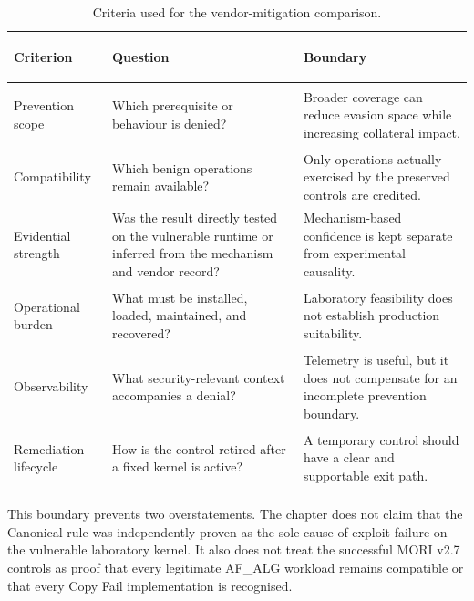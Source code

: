 \begin{table}[H]
    \centering
    \caption{Criteria used for the vendor-mitigation comparison.}
    \label{tab:vendor-comparison-criteria}
    \small
    \begin{tabularx}{\textwidth}{@{}>{\bfseries\raggedright\arraybackslash}p{}>{\raggedright\arraybackslash}p{}Y@{}}
        \toprule
        Criterion & Question & Boundary \\
        \midrule
        Prevention scope &
        Which prerequisite or behaviour is denied? &
        Broader coverage can reduce evasion space while increasing collateral
        impact. \\

        Compatibility &
        Which benign operations remain available? &
        Only operations actually exercised by the preserved controls are
        credited. \\

        Evidential strength &
        Was the result directly tested on the vulnerable runtime or inferred
        from the mechanism and vendor record? &
        Mechanism-based confidence is kept separate from experimental causality. \\

        Operational burden &
        What must be installed, loaded, maintained, and recovered? &
        Laboratory feasibility does not establish production suitability. \\

        Observability &
        What security-relevant context accompanies a denial? &
        Telemetry is useful, but it does not compensate for an incomplete
        prevention boundary. \\

        Remediation lifecycle &
        How is the control retired after a fixed kernel is active? &
        A temporary control should have a clear and supportable exit path. \\
        \bottomrule
    \end{tabularx}
\end{table}

This boundary prevents two overstatements. The chapter does not claim that the
Canonical rule was independently proven as the sole cause of exploit failure
on the vulnerable laboratory kernel. It also does not treat the successful
MORI v2.7 controls as proof that every legitimate AF\_ALG workload remains
compatible or that every Copy Fail implementation is recognised.

